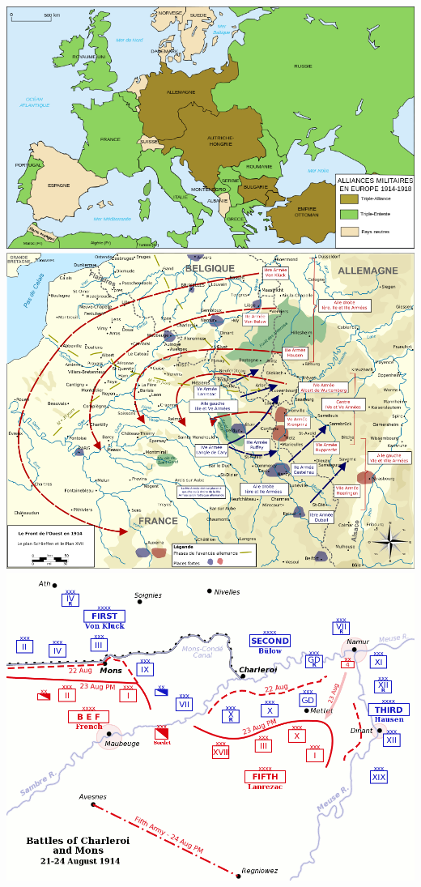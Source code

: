 \documentclass{article}
\begin{document}
\includegraphics[width=\linewidth]{../ressources/alliances_ww1}
\includegraphics[width=\linewidth]{../ressources/strategy_ww1}
\includegraphics[width=\linewidth]{../ressources/Battles_of_Charleroi_ww1}
\cite{ww1, military_strategy, tactic}
\end{document}
